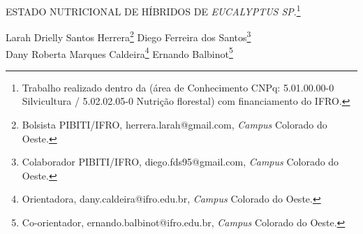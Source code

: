 \documentclass[article,12pt,onesidea,4paper,english,brazil]{abntex2}
\begin{document}
	
	
	\frenchspacing 
	
	\begin{center}
		\LARGE ESTADO NUTRICIONAL DE HÍBRIDOS DE \textit{EUCALYPTUS SP}.\footnote{Trabalho realizado dentro da (área de Conhecimento CNPq: 5.01.00.00-0 Silvicultura / 5.02.02.05-0 Nutrição florestal) com financiamento do IFRO.}
		
		\normalsize
		Larah Drielly Santos Herrera\footnote{Bolsista PIBITI/IFRO, herrera.larah@gmail.com, \textit{Campus} Colorado do Oeste.} 
		Diego Ferreira dos Santos\footnote{Colaborador PIBITI/IFRO, diego.fds95@gmail.com, \textit{Campus} Colorado do Oeste.} \\
		Dany Roberta Marques Caldeira\footnote{Orientadora, dany.caldeira@ifro.edu.br, \textit{Campus} Colorado do Oeste.} 
		Ernando Balbinot\footnote{Co-orientador, ernando.balbinot@ifro.edu.br, \textit{Campus} Colorado do Oeste.} 
	\end{center}
	
\end{document}
